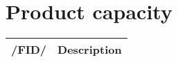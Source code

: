\chapter{Product capacity}
\begin{tabular}{|l | l|}
   \hline
  /FID/ & Description \\
   \hline
\end{tabular}
